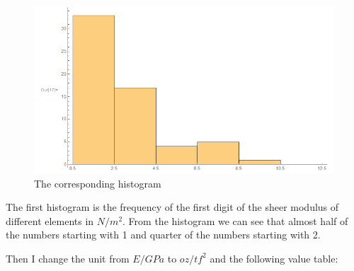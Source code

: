 \documentclass[12pt]{article}
\begin{document}
\begin{figure}[H]
\centering
\includegraphics[scale=0.38]{P1.png}
\caption{The corresponding histogram}
\end{figure}
The first histogram is the frequency of the first digit of the sheer modulus of different elements in $N/m^2$. From the histogram we can see that almost half of the numbers starting with 1 and quarter of the numbers starting with 2.
\par Then I change the unit from $E/GPa$ to $oz/tf^2$ and the following value table:
\end{document}
